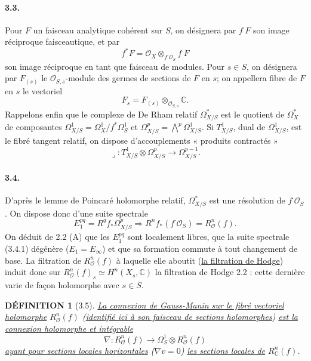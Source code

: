 \documentclass[10pt,leqno]{article}
\newcommand{\C}{\mathbb C}
\newcommand{\cO}{\mathcal O}
\theoremstyle{deligne}
\newtheorem*{definition}{DÉFINITION}
\renewcommand{\underline}[1]{\uline{#1}}
\begin{document}
\paragraph{3.3.}
Pour $F$ un faisceau analytique cohérent sur $S$, on désignera par $f^\cdot F$ son image réciproque faisceautique, et par
\[
f^*F=\cO_X\otimes_{f^\cdot\cO_S}f^\cdot F
\]
son image réciproque en tant que faisceau de modules. Pour $s\in S$, on désignera par $F_{(s)}$ le $\cO_{S,s}$-module des germes de sections de $F$ en $s$; on appellera fibre de $F$ en $s$ le vectoriel
\[
F_s=F_{(s)}\otimes_{\cO_{S,s}}\C .
\]
Rappelons enfin que le complexe de De Rham relatif $\Omega_{X/S}^*$ est le quotient de $\Omega_X^*$ de composantes $\Omega^1_{X/S}=\Omega_X^1/f^*\Omega_S^1$ et $\Omega^p_{X/S}=\bigwedge^p\Omega_{X/S}^1$.
Si $T^1_{X/S}$, dual de $\Omega^1_{X/S}$, est le fibré tangent relatif, on dispose d'accouplements « produits contractés »
\begin{equation}
\lrcorner:T^1_{X/S}\otimes\Omega^p_{X/S}\longrightarrow\Omega^{p-1}_{X/S}.
\tag{3.3.1}
\end{equation}

\paragraph{3.4.}
D'après le lemme de Poincaré holomorphe relatif, $\Omega_{X/S}^*$ est une résolution de $f^\cdot\cO_S$. On dispose donc d'une suite spectrale
\begin{equation}
E_1^{pq}=R^qf_*\Omega^p_{X/S}\Rightarrow R^n f_*(f^\cdot\cO_S)=R_\cO^n(f).
\tag{3.4.1}
\end{equation}
On déduit de 2.2 (A) que les $E_1^{pq}$ sont localement libres, que la suite spectrale (3.4.1) dégénère ($E_1=E_\infty$) et que sa formation commute à tout changement de base. La filtration de $R_\cO^n(f)$ à laquelle elle aboutit (\underline{la filtration de Hodge}) induit donc sur $R_\cO^n(f)_s\simeq H^n(X_s,\C)$ la filtration de Hodge 2.2 : cette dernière varie de façon holomorphe avec $s\in S$.

\begin{definition}[3.5]
\underline{La connexion de Gauss-Manin sur le fibré vectoriel holomorphe} $R_\cO^n(f)$ (\underline{identifié ici à son faisceau de sections holomorphes}) \underline{est la connexion holomorphe et intégrable}
\[
\nabla:R_\cO^n(f)\longrightarrow\Omega_S^1\otimes R_\cO^n(f)
\]
\underline{ayant pour sections locales horizontales} ($\nabla v=0$) \underline{les sections locales de} $R_\C^n(f)$.
\end{definition}
\end{document}
